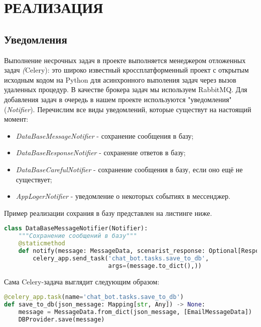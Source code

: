 \section{РЕАЛИЗАЦИЯ}
    \subsection{Уведомления}
    Выполнение несрочных задач в проекте выполняется менеджером отложенных задач \textit(Celery):
    это широко известный кроссплатформенный проект с открытым исходным кодом на Python для
    асинхронного выполения задач через вызов удаленных процедур. В качестве брокера задач мы используем RabbitMQ.
    Для добавления задач в очередь в нашем проекте используются "уведомления" (\textit{Notifier}).
    Перечислим все виды уведомлений, которые существут на настоящий момент:
    \begin{itemize}
        \item \textit{DataBaseMessageNotifier} - сохранение сообщения в базу;
        \item \textit{DataBaseResponseNotifier} - сохранение ответов в базу;
        \item \textit{DataBaseCarefulNotifier} - сохранение сообщения в базу, если оно ещё не существует;
        \item \textit{AppLogerNotifier} - уведомление о некоторых событиях в мессенджер.
    \end{itemize}
    Пример реализации сохрания в базу представлен на листинге ниже.
\begin{lstlisting}[language=Python]
class DataBaseMessageNotifier(Notifier):
    """Сохранение сообщений в базу"""
    @staticmethod
    def notify(message: MessageData, scenarist_response: Optional[ResponseData] = None) -> None:
        celery_app.send_task('chat_bot.tasks.save_to_db',
                             args=(message.to_dict(),))
\end{lstlisting}
    Сама Celery-задача выглядит следующим образом:
\begin{lstlisting}[language=Python]
@celery_app.task(name='chat_bot.tasks.save_to_db')
def save_to_db(json_message: Mapping[str, Any]) -> None:
    message = MessageData.from_dict(json_message, [EmailMessageData])
    DBProvider.save(message)
\end{lstlisting}

